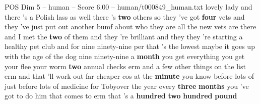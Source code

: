 \begin{textsample}{POS Dim 5 – human – Score 6.00 – human/t000849\_human.txt}  \label{ex:f5_pos_002}
lovely lady and there 's a Polish lass as well there 's \textbf{two} others so they 've got \textbf{four} vets and they 've just put out another bumf about who they are all the new vets are there and I met the \textbf{two} of them and they 're brilliant and they they 're starting a healthy pet club and for nine ninety-nine per that 's the lowest maybe it goes up with the age of the dog nine ninety-nine a \textbf{month} you get everything you get your flee your worm \textbf{two} annual checks erm and a few other things on the list erm and that 'll work out far cheaper cos at the \textbf{minute} you know before lots of just before lots of medicine for Tobyover the year every \textbf{three} \textbf{months} you 've got to do him that comes to erm that 's a \textbf{hundred} \textbf{two} \textbf{hundred} \textbf{pound}

\end{textsample}
